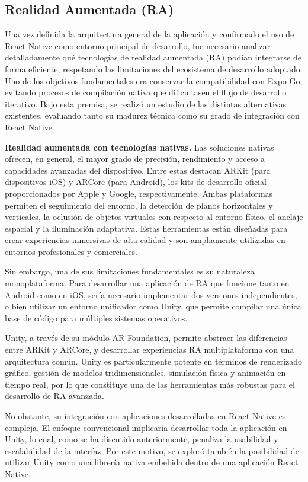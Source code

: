 \subsection{Realidad Aumentada (RA)}

Una vez definida la arquitectura general de la aplicación y confirmado el uso de React Native como entorno principal de desarrollo, fue necesario analizar detalladamente qué tecnologías de realidad aumentada (RA) podían integrarse de forma eficiente, respetando las limitaciones del ecosistema de desarrollo adoptado. Uno de los objetivos fundamentales era conservar la compatibilidad con Expo Go, evitando procesos de compilación nativa que dificultasen el flujo de desarrollo iterativo. Bajo esta premisa, se realizó un estudio de las distintas alternativas existentes, evaluando tanto su madurez técnica como su grado de integración con React Native.

\textbf{Realidad aumentada con tecnologías nativas.}
Las soluciones nativas ofrecen, en general, el mayor grado de precisión, rendimiento y acceso a capacidades avanzadas del dispositivo. Entre estas destacan ARKit (para dispositivos iOS) y ARCore (para Android), los kits de desarrollo oficial proporcionados por Apple y Google, respectivamente. Ambas plataformas permiten el seguimiento del entorno, la detección de planos horizontales y verticales, la oclusión de objetos virtuales con respecto al entorno físico, el anclaje espacial y la iluminación adaptativa. Estas herramientas están diseñadas para crear experiencias inmersivas de alta calidad y son ampliamente utilizadas en entornos profesionales y comerciales.

Sin embargo, una de sus limitaciones fundamentales es su naturaleza monoplataforma. Para desarrollar una aplicación de RA que funcione tanto en Android como en iOS, sería necesario implementar dos versiones independientes, o bien utilizar un entorno unificador como Unity, que permite compilar una única base de código para múltiples sistemas operativos.

Unity, a través de su módulo AR Foundation, permite abstraer las diferencias entre ARKit y ARCore, y desarrollar experiencias RA multiplataforma con una arquitectura común. Unity es particularmente potente en términos de renderizado gráfico, gestión de modelos tridimensionales, simulación física y animación en tiempo real, por lo que constituye una de las herramientas más robustas para el desarrollo de RA avanzada.

No obstante, su integración con aplicaciones desarrolladas en React Native es compleja. El enfoque convencional implicaría desarrollar toda la aplicación en Unity, lo cual, como se ha discutido anteriormente, penaliza la usabilidad y escalabilidad de la interfaz. Por este motivo, se exploró también la posibilidad de utilizar Unity como una librería nativa embebida dentro de una aplicación React Native.

